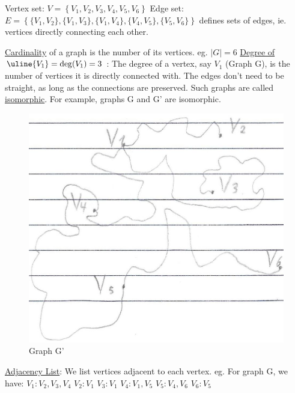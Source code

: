 \documentclass[12pt]{article}
\begin{document}
\begin{flushleft}
	Vertex set: $\displaystyle V = \left\{ V_1, V_2, V_3, V_4, V_5, V_6 \right\}$ \linebreak 
	Edge set: $\displaystyle E= \left\{ \{V_1,V_2\}, \{V_1,V_3\}, \{V_1, V_4\}, \{V_4, V_5\}, \{V_5, V_6\} \right\}$ defines sets of edges, ie. vertices directly connecting each other. \linebreak 
	
	\textbullet \quad \uline{Cardinality} of a graph is the number of its vertices. eg. $|G| = 6$ \linebreak 
	\textbullet \quad \uline{Degree of }$\uline{V_1} = \deg (V_1) = 3$  :  The degree of a vertex, say $V_1$ (Graph G), is the number  of vertices it is directly connected with. \linebreak 
	\textbullet \quad The edges don't need to be straight, as long as the connections are preserved. Such graphs are called \uline{isomorphic}. For example, graphs G and G' are isomorphic. \linebreak 
	
	\begin{figure}[H]
	\centering
	\includegraphics[scale=1]{graphG_}
	\caption{Graph G'}
	\label{fig:graphG_}
	\end{figure}
	
	\textbullet \quad \uline{Adjacency List}: We list vertices adjacent to each vertex. eg. For graph G, we have: \linebreak 
	$V_1: V_2, V_3, V_4$ \linebreak 
	$V_2: V_1$ \linebreak 
	$V_3: V_1$ \linebreak 
	$V_4: V_1, V_5$ \linebreak 
	$V_5: V_4, V_6$ \linebreak 
	$V_6: V_5$ \linebreak 
	

\end{flushleft}
\end{document}
